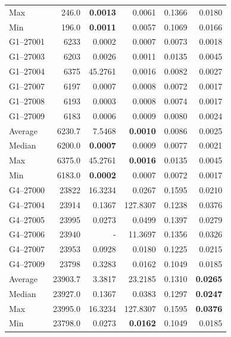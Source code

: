 \documentclass[pdflatex,sn-mathphys-num]{sn-jnl}
\begin{document}
\begin{table}[htbp]
\begin{tabular*}{\textwidth}{l@{\extracolsep{\fill}}rrrrr}
Max & 246.0 & \textbf{0.0013} & 0.0061 & 0.1366 & 0.0180 \\
Min & 196.0 & \textbf{0.0011} & 0.0057 & 0.1069 & 0.0166 \\
\midrule
G1--27001 & 6233 & 0.0002 & 0.0007 & 0.0073 & 0.0018 \\
G1--27003 & 6203 & 0.0026 & 0.0011 & 0.0135 & 0.0045 \\
G1--27004 & 6375 & 45.2761 & 0.0016 & 0.0082 & 0.0027 \\
G1--27007 & 6197 & 0.0007 & 0.0008 & 0.0072 & 0.0017 \\
G1--27008 & 6193 & 0.0003 & 0.0008 & 0.0074 & 0.0017 \\
G1--27009 & 6183 & 0.0006 & 0.0009 & 0.0080 & 0.0024 \\
\midrule
Average & 6230.7 & 7.5468 & \textbf{0.0010} & 0.0086 & 0.0025 \\
Median & 6200.0 & \textbf{0.0007} & 0.0009 & 0.0077 & 0.0021 \\
Max & 6375.0 & 45.2761 & \textbf{0.0016} & 0.0135 & 0.0045 \\
Min & 6183.0 & \textbf{0.0002} & 0.0007 & 0.0072 & 0.0017 \\
\midrule
G4--27000 & 23822 & 16.3234 & 0.0267 & 0.1595 & 0.0210 \\
G4--27004 & 23914 & 0.1367 & 127.8307 & 0.1238 & 0.0376 \\
G4--27005 & 23995 & 0.0273 & 0.0499 & 0.1397 & 0.0279 \\
G4--27006 & 23940 & - & 11.3697 & 0.1356 & 0.0326 \\
G4--27007 & 23953 & 0.0928 & 0.0180 & 0.1225 & 0.0215 \\
G4--27009 & 23798 & 0.3283 & 0.0162 & 0.1049 & 0.0185 \\
\midrule
Average & 23903.7 & 3.3817 & 23.2185 & 0.1310 & \textbf{0.0265} \\
Median & 23927.0 & 0.1367 & 0.0383 & 0.1297 & \textbf{0.0247} \\
Max & 23995.0 & 16.3234 & 127.8307 & 0.1595 & \textbf{0.0376} \\
Min & 23798.0 & 0.0273 & \textbf{0.0162} & 0.1049 & 0.0185 \\
\bottomrule
\end{tabular*}
\end{table}
\end{document}
